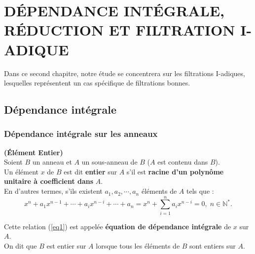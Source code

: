 \chapter{DÉPENDANCE INTÉGRALE, RÉDUCTION ET FILTRATION I-ADIQUE}

Dans ce second chapitre, notre étude se concentrera sur les filtrations I-adiques, lesquelles représentent un cas spécifique de filtrations bonnes.

\section{Dépendance intégrale}
\subsection{Dépendance intégrale sur les anneaux}
\begin{madefinition}\textbf{(Élément Entier)} \\
	Soient $B$ un anneau et $A$ un sous-anneau de $B$ ($A $ est contenu dans $ B$).\\
	Un élément $x$ de $B$ est dit \textbf{entier} sur $A$ s'il est \textbf{racine d'un polynôme unitaire à coefficient dans} $A$.\\
	En d'autres termes, s'ils existent $a_1, a_2, \cdots , a_n$ éléments de $A$ tels que :\\
	\begin{equation}
		\label{eq1}
		x^n + a_1 x^{n-1} +\cdots+a_i x^{n-i} +\cdots + a_n = x^n + \sum_{i=1}^{n} a_i x^{n-i} = 0, \; n \in \mathbb{N^*}.
	\end{equation}
	
	Cette relation (\ref{eq1}) est appelée \textbf{équation de dépendance intégrale} de $x$ sur $A$.\\
	On dit que $B$ est entier sur $A$ lorsque tous les éléments de $B$ sont entiers sur $A$.
\end{madefinition}

